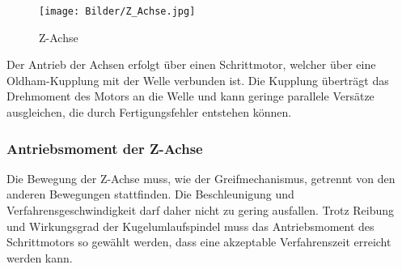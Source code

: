 \documentclass{scrartcl}
\begin{document}
\begin{figure}[htbp] 
  \centering
     \texttt{[image: Bilder/Z\_Achse.jpg]}
			\caption{Z-Achse}
  \label{fig:Bild1}
\end{figure}


Der Antrieb der Achsen erfolgt über einen Schrittmotor, welcher über eine Oldham-Kupplung mit der Welle verbunden ist.
Die Kupplung überträgt das Drehmoment des Motors an die Welle und kann geringe parallele Versätze ausgleichen, die durch Fertigungsfehler entstehen können.\\




\subsubsection{Antriebsmoment der Z-Achse}

Die Bewegung der Z-Achse muss, wie der Greifmechanismus, getrennt von den anderen Bewegungen stattfinden. Die Beschleunigung und Verfahrensgeschwindigkeit darf daher nicht zu gering ausfallen. Trotz Reibung und Wirkungsgrad der Kugelumlaufspindel muss das Antriebsmoment des Schrittmotors so gewählt werden, dass eine akzeptable Verfahrenszeit erreicht werden kann.
\end{document}
